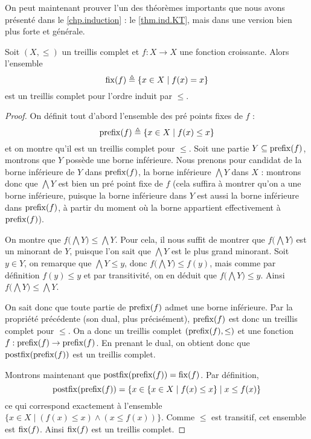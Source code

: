 On peut maintenant prouver l'un des théorèmes importants que nous avons présenté
dans le \cref{chp.induction} : le \cref{thm.ind.KT}, mais dans une version bien
plus forte et générale.

\begin{theorem}
  Soit $(X,\leq)$ un treillis complet et $f : X \to X$ une fonction croissante.
  Alors l'ensemble
  \[\operatorname{fix}(f) \triangleq \{x\in X \mid f(x) = x\}\]
  est un treillis complet pour l'ordre induit par $\leq$.
\end{theorem}

\begin{proof}
  On définit tout d'abord l'ensemble des pré points fixes de $f$ :
  \[\operatorname{prefix}(f) \triangleq \{x\in X\mid f(x)\leq x\}\]
  et on montre qu'il est un treillis complet pour $\leq$. Soit une partie
  $Y\subseteq\operatorname{prefix}(f)$, montrons que $Y$ possède une borne inférieure. Nous
  prenons pour candidat de la borne inférieure de $Y$ dans $\operatorname{prefix}(f)$, la
  borne inférieure $\bigwedge Y$ dans $X$ : montrons donc que $\bigwedge Y$ est
  bien un pré point fixe de $f$ (cela suffira à montrer qu'on a une borne
  inférieure, puisque la borne inférieure dans $Y$ est aussi la borne inférieure
  dans $\operatorname{prefix}(f)$, à partir du moment où la borne appartient effectivement à
  $\operatorname{prefix}(f)$).

  On montre que $f\big(\bigwedge Y\big) \leq \bigwedge Y$. Pour cela, il nous
  suffit de montrer que $f\big(\bigwedge Y\big)$ est un minorant de $Y$, puisque
  l'on sait que $\bigwedge Y$ est le plus grand minorant. Soit $y\in Y$, on
  remarque que $\bigwedge Y \leq y$, donc $f\big(\bigwedge Y\big) \leq f(y)$,
  mais comme par définition $f(y)\leq y$ et par transitivité, on en déduit que
  $f\big(\bigwedge Y\big) \leq y$. Ainsi
  $f\big(\bigwedge Y\big) \leq \bigwedge Y$.

  On sait donc que toute partie de $\operatorname{prefix}(f)$ admet une borne inférieure. Par
  la propriété précédente (son dual, plus précisément), $\operatorname{prefix}(f)$ est donc
  un treillis complet pour $\leq$. On a donc un treillis complet
  $(\operatorname{prefix}(f),\leq)$ et une fonction $f : \operatorname{prefix}(f) \to\operatorname{prefix}(f)$. En prenant
  le dual, on obtient donc que $\operatorname{postfix}(\operatorname{prefix}(f))$ est un treillis complet.

  Montrons maintenant que $\operatorname{postfix}(\operatorname{prefix}(f)) = \operatorname{fix}(f)$. Par définition,
  \[\operatorname{postfix}(\operatorname{prefix}(f)) = \{x\in \{x\in X \mid f(x)\leq x\} \mid x \leq f(x)\}\]
  ce qui correspond exactement à l'ensemble
  $\{x\in X\mid (f(x) \leq x) \land (x \leq f(x))\}$. Comme $\leq$ est
  transitif, cet ensemble est $\operatorname{fix}(f)$. Ainsi $\operatorname{fix}(f)$ est un treillis complet.
\end{proof}

